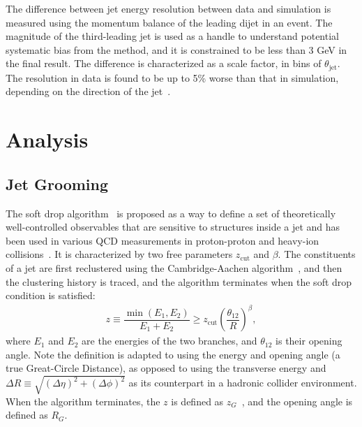 \documentclass[aps,preprint,superscriptaddress,groupedaddress]{revtex4}  %
\newcommand{\zg}{\ensuremath{z_G}\xspace}
\newcommand{\Rg}{\ensuremath{R_G}\xspace}
\begin{document}
The difference between jet energy resolution between data and simulation is measured using the momentum balance of the leading dijet in an event.  The magnitude of the third-leading jet is used as a handle to understand potential systematic bias from the method, and it is constrained to be less than 3 GeV in the final result.  The difference is characterized as a scale factor, in bins of $\theta_\text{jet}$.  The resolution in data is found to be up to 5\% worse than that in simulation, depending on the direction of the jet~\cite{Chen:2021iyj}.


\section{\label{Section:Analysis}Analysis}

\subsection{Jet Grooming}

The soft drop algorithm~\cite{Larkoski:2014wba,Dasgupta:2013ihk} is proposed as a way to define a set of theoretically well-controlled observables that are sensitive to structures inside a jet and has been used in various QCD measurements in proton-proton and heavy-ion collisions~\cite{CMS:2017qlm,ALICE:2019ykw, STAR:2020ejj,ATLAS:2019mgf,CMS:2018ypj,CMS:2018fof}.  It is characterized by two free parameters $z_\text{cut}$ and $\beta$.  The constituents of a jet are first reclustered using the Cambridge-Aachen algorithm~\cite{Dokshitzer:1997in,Wobisch:1998wt}, and then the clustering history is traced, and the algorithm terminates when the soft drop condition is satisfied:
%
\begin{align}
    z \equiv \dfrac{\min(E_1, E_2)}{E_1 + E_2} \geq z_\text{cut} \left(\dfrac{\theta_{12}}{R}\right)^\beta,\nonumber
\end{align}
%
where $E_1$ and $E_2$ are the energies of the two branches, and $\theta_{12}$ is their opening angle.  Note the definition is adapted to using the energy and opening angle (a true Great-Circle Distance), as opposed to using the transverse energy and $\Delta R \equiv \sqrt{(\Delta\eta)^2+(\Delta\phi)^2}$ as its counterpart in a hadronic collider environment.  When the algorithm terminates, the $z$ is defined as \zg~\cite{Larkoski:2017bvj}, and the opening angle is defined as \Rg.
\end{document}
